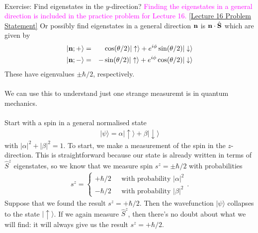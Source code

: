 \documentclass[12pt]{article}
\def\be{\begin{eqnarray}}
\def\ee{\end{eqnarray}}
\newcommand{\nn}{\nonumber}
\newcommand\para{\paragraph{}}
\newcommand{\ket}[1]{|#1\rangle}
\newcommand{\co}{\color{olive}}
\newcommand{\cblue}{\color{blue}}
\newcommand{\upket}{|\uparrow\rangle}
\newcommand{\downket}{|\downarrow\rangle}
\newcommand{\alyssa}{\textcolor{magenta}}
\begin{document}
{{\para
{\cblue Exercise: Find eigenstates in the $y$-direction? \alyssa{Finding the eigenstates in a general direction is included in the practice problem for Lecture 16.} \href{https://drive.google.com/file/d/1jvtDfjA08XnCLlPbO-3-0mzkFylVRBVq/view?usp=drive_link}{[Lecture 16 Problem Statement]} Or possibly find eigenstates in a general direction ${\bf n}$ is ${\bf n}\cdot \hat{\bf S}$ which are given by
%
\be \ket{{\bf n};+} &=& \cos(\theta/2) \upket + e^{i\phi}\sin(\theta/2)\downket\nn\\ \ket{{\bf n};-}&=& -\sin(\theta/2)\upket + e^{i\phi} \cos(\theta/2)\downket  \nn\ee
%
These have eigenvalues $\pm \hbar/2$, respectively. }


\para
We can use this to understand just one strange measuremt is in quantum mechanics. 


\para
{\co Start with a spin in a general normalised state
%
\be \ket{\psi} = \alpha \upket + \beta \downket\nn\ee
%
with $|\alpha|^2 + |\beta|^2 = 1$.  To start, we make a  measurement of the spin in the $z$-direction.} This is straightforward because our state is already written in terms of $\hat{S}^z$ eigenstates, so we know that we measure spin $s^z=\pm \hbar/2$ with probabilities
%
\be s^z = \left\{\begin{array}{cc} +{\hbar}/{2}\ \ \ &\mbox{with probability $|\alpha|^2$}  \\ -{\hbar}/{2}\ \ \ &\mbox{with probability $|\beta|^2$}\end{array}\right..\ee
%
Suppose that we found the result $s^z=+\hbar/2$. Then the wavefunction $\ket{\psi}$ collapses to the state $\upket$. If we again measure $\hat{S}^z$, then there's no doubt about what we will find: it will always give us the result $s^z=+\hbar/2$. 

}}
\end{document}
